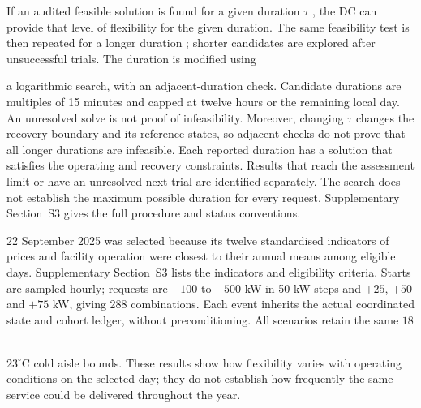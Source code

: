 \documentclass[lettersize,journal]{IEEEtran}
\providecommand{\DIFadd}[1]{{\color{blue}#1}}
\providecommand{\DIFaddbegin}{}
\providecommand{\DIFaddend}{}
\begin{document}
If  \DIFaddbegin \DIFadd{an audited feasible solution is found }\DIFaddend for a given duration $\tau$ , the DC can provide that level of flexibility for the given duration. The same feasibility test is then repeated for a longer duration \DIFaddbegin \DIFadd{; shorter candidates are explored after unsuccessful trials. The }\DIFaddend duration is modified using  \DIFaddbegin \DIFadd{a logarithmic search, with an adjacent-duration check. Candidate durations are multiples of 15 minutes and capped at twelve hours or the remaining local day. An unresolved solve is not proof of infeasibility. Moreover, changing $\tau$ changes the recovery boundary and its reference states, so adjacent checks do not prove that all longer durations are infeasible. Each reported duration has a solution that satisfies the operating and recovery constraints. Results that reach the assessment limit or have an unresolved next trial are identified separately. The search does not establish the maximum possible duration for every request. Supplementary Section~S3 gives the full procedure and status conventions.

}\DIFaddend 

 \DIFaddbegin \DIFadd{22 September 2025 was selected because its twelve standardised indicators of prices and facility operation were closest to their annual means among eligible days. Supplementary Section~S3 lists the indicators and eligibility criteria. Starts are sampled hourly; requests are $-100$ }\DIFaddend to \DIFaddbegin \DIFadd{$-500$ kW in 50 kW steps and $+25$, $+50$ and $+75$ kW, giving 288 combinations. Each event inherits the actual coordinated state and cohort ledger, without preconditioning. All scenarios retain the same }\DIFaddend $18$-- \DIFaddbegin \DIFadd{$23^\circ$C cold aisle bounds. These results show how flexibility varies with operating conditions on the selected day; they do not establish how frequently the same service could be delivered throughout the year.

}\DIFaddend 
\end{document}

